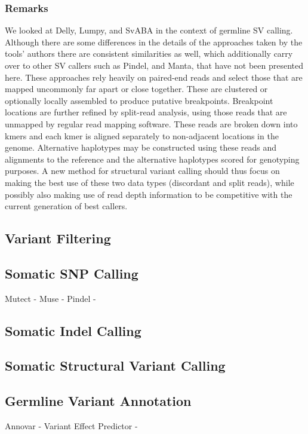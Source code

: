 \subsubsection{Remarks}

We looked at Delly, Lumpy, and SvABA in the context of germline SV calling. Although there are some differences in the details of the approaches taken by the tools' authors there are consistent similarities as well, which additionally carry over to other SV callers such as Pindel\autocite{ye2009pindel}, and Manta\autocite{chen2015manta}, that have not been presented here. These approaches rely heavily on paired-end reads and select those that are mapped uncommonly far apart or close together. These are clustered or optionally locally assembled to produce putative breakpoints. Breakpoint locations are further refined by split-read analysis, using those reads that are unmapped by regular read mapping software. These reads are broken down into kmers and each kmer is aligned separately to non-adjacent locations in the genome. Alternative haplotypes may be constructed using these reads and alignments to the reference and the alternative haplotypes scored for genotyping purposes. A new method for structural variant calling should thus focus on making the best use of these two data types (discordant and split reads), while possibly also making use of read depth information to be competitive with the current generation of best callers. 

\subsection{Variant Filtering}

\subsection{Somatic SNP Calling}
Mutect - 
Muse - 
Pindel -


\subsection{Somatic Indel Calling}

\subsection{Somatic Structural Variant Calling}

\subsection{Germline Variant Annotation}
Annovar - 
Variant Effect Predictor - 


